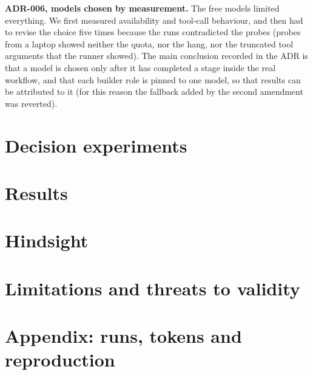 \documentclass[10pt,a4paper]{article}
\newcommand{\adr}[1]{\textsf{ADR-#1}}
\begin{document}
\textbf{\adr{006}, models chosen by measurement.} The free models limited everything. We first measured availability and tool-call behaviour, and then had to revise the choice five times because the runs contradicted the probes (probes from a laptop showed neither the quota, nor the hang, nor the truncated tool arguments that the runner showed). The main conclusion recorded in the ADR is that a model is chosen only after it has completed a stage inside the real workflow, and that each builder role is pinned to one model, so that results can be attributed to it (for this reason the fallback added by the second amendment was reverted).

\section{Decision experiments}\label{sec:exp}


\section{Results}\label{sec:results}


\section{Hindsight}


\section{Limitations and threats to validity}


\appendix
\section{Appendix: runs, tokens and reproduction}

\end{document}
